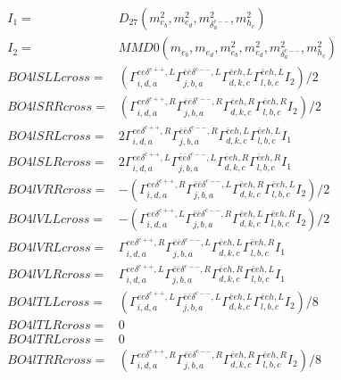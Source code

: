 \documentclass[A4,landscape]{article}
\begin{document}
\begin{align} 
I_1 = & D_{27}(m^2_{e_{{b}}}, m^2_{e_{{d}}}, m^2_{\delta^{c--}_{{a}}}, m^2_{h_{{c}}}) \\ 
I_2 = & MMD0(m_{e_{{b}}}, m_{e_{{d}}}, m^2_{e_{{b}}}, m^2_{e_{{d}}}, m^2_{\delta^{c--}_{{a}}}, m^2_{h_{{c}}}) \\ 
  BO4lSLLcross= & ( \Gamma^{e e \delta^{c++},L}_{i, d, a} \Gamma^{\bar{e}\bar{e}\delta^{c--} ,L}_{j, b, a} \Gamma^{\bar{e}e h ,L}_{d, k, c} \Gamma^{\bar{e}e h ,L}_{l, b, c} I_2)/2 \\ 
  BO4lSRRcross= & ( \Gamma^{e e \delta^{c++},R}_{i, d, a} \Gamma^{\bar{e}\bar{e}\delta^{c--} ,R}_{j, b, a} \Gamma^{\bar{e}e h ,R}_{d, k, c} \Gamma^{\bar{e}e h ,R}_{l, b, c} I_2)/2 \\ 
  BO4lSRLcross= & 2  \Gamma^{e e \delta^{c++},R}_{i, d, a} \Gamma^{\bar{e}\bar{e}\delta^{c--} ,R}_{j, b, a} \Gamma^{\bar{e}e h ,L}_{d, k, c} \Gamma^{\bar{e}e h ,L}_{l, b, c} I_1 \\ 
  BO4lSLRcross= & 2  \Gamma^{e e \delta^{c++},L}_{i, d, a} \Gamma^{\bar{e}\bar{e}\delta^{c--} ,L}_{j, b, a} \Gamma^{\bar{e}e h ,R}_{d, k, c} \Gamma^{\bar{e}e h ,R}_{l, b, c} I_1 \\ 
  BO4lVRRcross= & -( \Gamma^{e e \delta^{c++},R}_{i, d, a} \Gamma^{\bar{e}\bar{e}\delta^{c--} ,L}_{j, b, a} \Gamma^{\bar{e}e h ,R}_{d, k, c} \Gamma^{\bar{e}e h ,L}_{l, b, c} I_2)/2 \\ 
  BO4lVLLcross= & -( \Gamma^{e e \delta^{c++},L}_{i, d, a} \Gamma^{\bar{e}\bar{e}\delta^{c--} ,R}_{j, b, a} \Gamma^{\bar{e}e h ,L}_{d, k, c} \Gamma^{\bar{e}e h ,R}_{l, b, c} I_2)/2 \\ 
  BO4lVRLcross= &  \Gamma^{e e \delta^{c++},R}_{i, d, a} \Gamma^{\bar{e}\bar{e}\delta^{c--} ,L}_{j, b, a} \Gamma^{\bar{e}e h ,L}_{d, k, c} \Gamma^{\bar{e}e h ,R}_{l, b, c} I_1 \\ 
  BO4lVLRcross= &  \Gamma^{e e \delta^{c++},L}_{i, d, a} \Gamma^{\bar{e}\bar{e}\delta^{c--} ,R}_{j, b, a} \Gamma^{\bar{e}e h ,R}_{d, k, c} \Gamma^{\bar{e}e h ,L}_{l, b, c} I_1 \\ 
  BO4lTLLcross= & ( \Gamma^{e e \delta^{c++},L}_{i, d, a} \Gamma^{\bar{e}\bar{e}\delta^{c--} ,L}_{j, b, a} \Gamma^{\bar{e}e h ,L}_{d, k, c} \Gamma^{\bar{e}e h ,L}_{l, b, c} I_2)/8 \\ 
  BO4lTLRcross= & 0 \\ 
  BO4lTRLcross= & 0 \\ 
  BO4lTRRcross= & ( \Gamma^{e e \delta^{c++},R}_{i, d, a} \Gamma^{\bar{e}\bar{e}\delta^{c--} ,R}_{j, b, a} \Gamma^{\bar{e}e h ,R}_{d, k, c} \Gamma^{\bar{e}e h ,R}_{l, b, c} I_2)/8 \\ 
\end{align} 
\end{document}
